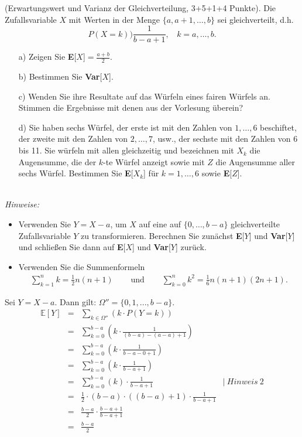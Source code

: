 \documentclass[twoside]{article}
\begin{document}
(Erwartungswert und Varianz der Gleichverteilung, 3+5+1+4 Punkte).
Die Zufallsvariable $X$ mit Werten in der Menge $\{a,a+1,\dots,b\}$ sei gleichverteilt, d.h.
\[
	P(X=k))\frac{1}{b-a+1},~~~~k=a,\dots,b.
\]
\begin{enumerate}
	\item[a)] Zeigen Sie \textbf{E}[$X$]$=\frac{a+b}{2}$.
	\item[b)] Bestimmen Sie \textbf{Var}[$X$].
	\item[c)] Wenden Sie ihre Resultate auf das Würfeln eines fairen Würfels an.
		Stimmen die Ergebnisse mit denen aus der Vorlesung überein?
	\item[d)] Sie haben sechs Würfel, der erste ist mit den Zahlen von $1,\dots,6$ beschiftet, der zweite mit den Zahlen von $2,\dots,7$, usw., der sechste mit den Zahlen von 6 bis 11.
		Sie würfeln mit allen gleichzeitig und bezeichnen mit $X_k$ die Augensumme, die der $k$-te Würfel anzeigt sowie mit $Z$ die Augensumme aller sechs Würfel.
		Bestimmen Sie \textbf{E}[$X_k$] für $k=1,\dots,6$ sowie \textbf{E}[$Z$].
\end{enumerate}
\vspace{-.2cm}\-\\
\textit{Hinweise:}
\begin{itemize}
	\item Verwenden Sie $Y=X-a$, um $X$ auf eine auf $\{0,\dots,b-a\}$ gleichverteilte Zufallsvariable $Y$ zu transformieren.
		Berechnen Sie zunächst \textbf{E}[$Y$] und \textbf{Var}[$Y$] und schließen Sie dann auf \textbf{E}[$X$] und \textbf{Var}[$Y$] zurück.
	\item Verwenden Sie die Summenformeln
	\[
		\begin{array}{ccc}
			\sum_{k=1}^{n}k = \frac{1}{2} n(n+1)	&	\text{~~~~und~~~~}	&	\sum_{k=0}^{n}k^2=\frac{1}{6}n(n+1)(2n+1).
		\end{array}
	\]
\end{itemize}
Sei $Y = X - a$.
Dann gilt: $\Omega'' = \{0, 1, ..., b-a\}$.
\begin{equation*}
    \begin{array}{rlll}
        \mathbb{E}[Y]&=    &\sum_{k \in \Omega''}(k \cdot P(Y = k))&\\
            &=    &\sum_{k = 0}^{b-a}(k \cdot \frac{1}{(b-a)-(a-a)+1})&\\
            &=    &\sum_{k = 0}^{b-a}(k \cdot \frac{1}{b-a-0+1})&\\
            &=    &\sum_{k = 0}^{b-a}(k \cdot \frac{1}{b-a+1})&\\
            &=    &\sum_{k = 0}^{b-a}(k) \cdot \frac{1}{b-a+1}& |~Hinweis~2\\
            &=    &\frac{1}{2} \cdot (b - a) \cdot((b - a) + 1) \cdot \frac{1}{b-a+1}&\\
            &=    &\frac{b-a}{2} \cdot \frac{b - a + 1}{b-a+1}&\\
            &=    &\frac{b - a}{2}&\\
    \end{array}
\end{equation*}
\end{document}
